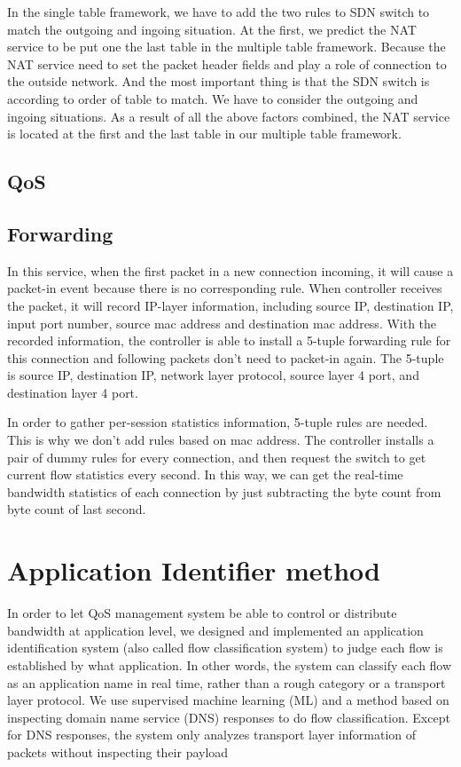 \documentclass[journal]{IEEEtran}
\begin{document}
In the single table framework, we have to add the two rules to SDN switch to match the outgoing and ingoing situation.
At the first, we predict the NAT service to be put one the last table in the multiple table framework.
Because the NAT service need to set the packet header fields and play a role of connection to the outside network.
And the most important thing is that the SDN switch is according to order of table to match.
We have to consider the outgoing and ingoing situations.
As a result of all the above factors combined,
the NAT service is located at the first and the last table in our multiple table framework.


\subsection{QoS}
\subsection{Forwarding}
In this service, when the first packet in a new connection incoming, it will cause a packet-in event because there is no corresponding rule. When controller receives the packet, it will record IP-layer information, including source IP, destination IP, input port number, source mac address and destination mac address. With the recorded information, the controller is able to install a 5-tuple forwarding rule for this connection and following packets don’t need to packet-in again. The 5-tuple is source IP, destination IP, network layer protocol, source layer 4 port, and destination layer 4 port.

In order to gather per-session statistics information, 5-tuple rules are needed. This is why we don’t add rules  based on mac address.  The controller installs a pair of dummy rules for every connection, and then request the switch to get current flow statistics every second. In this way, we can get the real-time bandwidth statistics of each connection by just subtracting the byte count from byte count of last second.



\section{Application Identifier method} \label{sec:app_classification}
In order to let QoS management system be able to control or distribute bandwidth at application level, we designed and implemented an application identification system (also called flow classification system) to judge each flow is established by what application. In other words, the system can classify each flow as an application name in real time, rather than a rough category or a transport layer protocol.
We use supervised machine learning (ML) and a method based on inspecting domain name service (DNS) responses to do flow classification. Except for DNS responses, the system only analyzes transport layer information of packets without inspecting their payload
\end{document}
